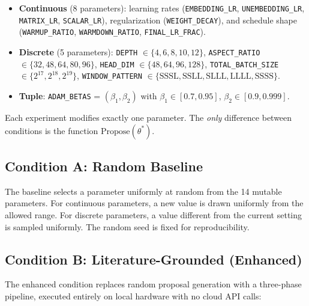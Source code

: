 \documentclass[11pt]{article}
\begin{document}
\begin{itemize}
  \item \textbf{Continuous} (8 parameters): learning rates
    (\texttt{EMBEDDING\_LR}, \texttt{UNEMBEDDING\_LR},
    \texttt{MATRIX\_LR}, \texttt{SCALAR\_LR}), regularization
    (\texttt{WEIGHT\_DECAY}), and schedule shape
    (\texttt{WARMUP\_RATIO}, \texttt{WARMDOWN\_RATIO},
    \texttt{FINAL\_LR\_FRAC}).
  \item \textbf{Discrete} (5 parameters): \texttt{DEPTH}
    $\in \{4,6,8,10,12\}$, \texttt{ASPECT\_RATIO}
    $\in \{32,48,64,80,96\}$, \texttt{HEAD\_DIM}
    $\in \{48,64,96,128\}$, \texttt{TOTAL\_BATCH\_SIZE}
    $\in \{2^{17}, 2^{18}, 2^{19}\}$, \texttt{WINDOW\_PATTERN}
    $\in \{\text{SSSL}, \text{SSLL}, \text{SLLL}, \text{LLLL},
    \text{SSSS}\}$.
  \item \textbf{Tuple}: \texttt{ADAM\_BETAS} = $(\beta_1, \beta_2)$
    with $\beta_1 \in [0.7, 0.95]$, $\beta_2 \in [0.9, 0.999]$.
\end{itemize}

Each experiment modifies exactly one parameter. The \emph{only}
difference between conditions is the function
$\text{Propose}(\theta^*)$.

\subsection{Condition A: Random Baseline}
\label{sec:baseline}

The baseline selects a parameter uniformly at random from the 14 mutable
parameters. For continuous parameters, a new value is drawn uniformly
from the allowed range. For discrete parameters, a value different from
the current setting is sampled uniformly. The random seed is fixed for
reproducibility.

\subsection{Condition B: Literature-Grounded (Enhanced)}
\label{sec:enhanced}

The enhanced condition replaces random proposal generation with a
three-phase pipeline, executed entirely on local hardware with no cloud
API calls:
\end{document}
